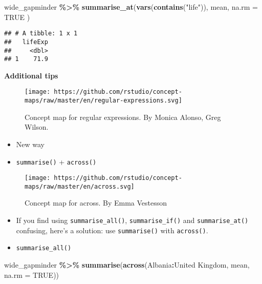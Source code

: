 \documentclass[
]{book}
\newenvironment{Shaded}{\begin{snugshade}}{\end{snugshade}}
\newcommand{\DataTypeTok}[1]{\textcolor[rgb]{0.13,0.29,0.53}{#1}}
\newcommand{\KeywordTok}[1]{\textcolor[rgb]{0.13,0.29,0.53}{\textbf{#1}}}
\newcommand{\NormalTok}[1]{#1}
\newcommand{\OperatorTok}[1]{\textcolor[rgb]{0.81,0.36,0.00}{\textbf{#1}}}
\newcommand{\OtherTok}[1]{\textcolor[rgb]{0.56,0.35,0.01}{#1}}
\newcommand{\StringTok}[1]{\textcolor[rgb]{0.31,0.60,0.02}{#1}}
\begin{document}
\begin{Shaded}
\begin{Highlighting}[]
\NormalTok{wide\_gapminder }\OperatorTok{\%\textgreater{}\%}
\StringTok{  }\KeywordTok{summarise\_at}\NormalTok{(}\KeywordTok{vars}\NormalTok{(}\KeywordTok{contains}\NormalTok{(}\StringTok{"life"}\NormalTok{)),}
\NormalTok{    mean,}
    \DataTypeTok{na.rm =} \OtherTok{TRUE}
\NormalTok{  )}
\end{Highlighting}
\end{Shaded}

\begin{verbatim}
## # A tibble: 1 x 1
##   lifeExp
##     <dbl>
## 1    71.9
\end{verbatim}

\textbf{Additional tips}

\begin{figure}
\centering
\texttt{[image: https://github.com/rstudio/concept-maps/raw/master/en/regular-expressions.svg]}
\caption{Concept map for regular expressions. By Monica Alonso, Greg Wilson.}
\end{figure}

\begin{itemize}
\item
  New way
\item
  \texttt{summarise()} + \texttt{across()}
\end{itemize}

\begin{figure}
\centering
\texttt{[image: https://github.com/rstudio/concept-maps/raw/master/en/across.svg]}
\caption{Concept map for across. By Emma Vestesson}
\end{figure}

\begin{itemize}
\item
  If you find using \texttt{summarise\_all()}, \texttt{summarise\_if()} and \texttt{summarise\_at()} confusing, here's a solution: use \texttt{summarise()} with \texttt{across()}.
\item
  \texttt{summarise\_all()}
\end{itemize}

\begin{Shaded}
\begin{Highlighting}[]
\NormalTok{wide\_gapminder }\OperatorTok{\%\textgreater{}\%}
\StringTok{  }\KeywordTok{summarise}\NormalTok{(}\KeywordTok{across}\NormalTok{(Albania}\OperatorTok{:}\StringTok{\textasciigrave{}}\DataTypeTok{United Kingdom}\StringTok{\textasciigrave{}}\NormalTok{, mean, }\DataTypeTok{na.rm =} \OtherTok{TRUE}\NormalTok{))}
\end{Highlighting}
\end{Shaded}
\end{document}
